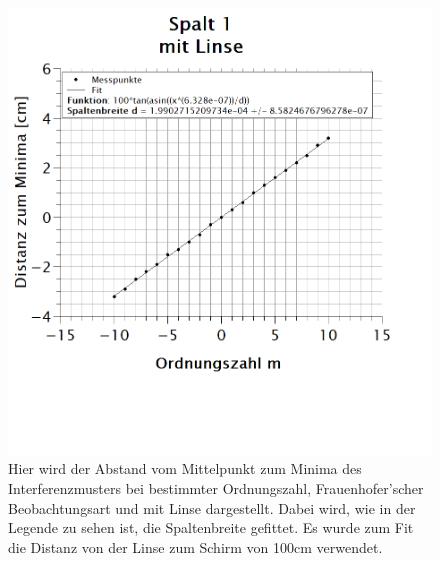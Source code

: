\newpage
\begin{figure}[h]
\centering
\includegraphics[width=\textwidth]{Bilder/spalt1_mitLinse.png} 
\vspace*{-3.5cm}
\caption[Spalt 1: mit Linse]{Hier wird der Abstand vom Mittelpunkt zum Minima des Interferenzmusters bei bestimmter Ordnungszahl, Frauenhofer'scher Beobachtungsart und mit Linse dargestellt. Dabei wird, wie in der Legende zu sehen ist, die Spaltenbreite gefittet. Es wurde zum Fit die Distanz von der Linse zum Schirm von 100cm verwendet.}
\label{fig:spalt1_mitLinse}
\end{figure}
\newpage

